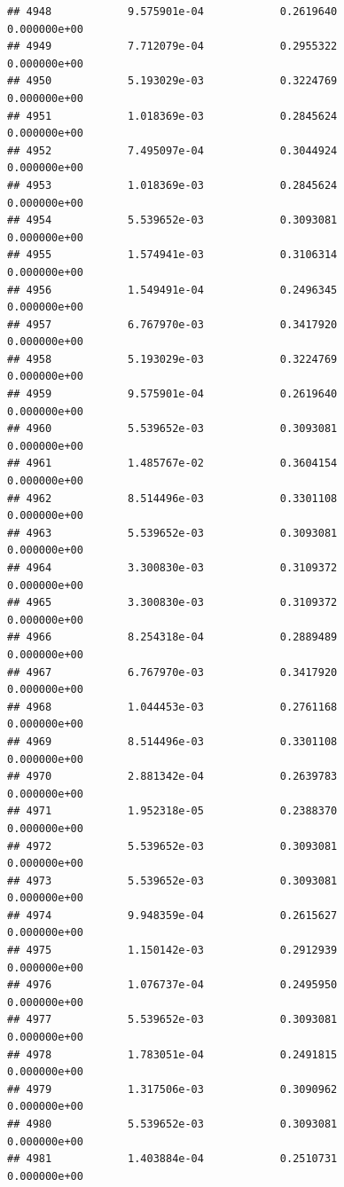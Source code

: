\documentclass[
]{article}
\begin{document}
\begin{verbatim}
## 4948            9.575901e-04            0.2619640            0.000000e+00
## 4949            7.712079e-04            0.2955322            0.000000e+00
## 4950            5.193029e-03            0.3224769            0.000000e+00
## 4951            1.018369e-03            0.2845624            0.000000e+00
## 4952            7.495097e-04            0.3044924            0.000000e+00
## 4953            1.018369e-03            0.2845624            0.000000e+00
## 4954            5.539652e-03            0.3093081            0.000000e+00
## 4955            1.574941e-03            0.3106314            0.000000e+00
## 4956            1.549491e-04            0.2496345            0.000000e+00
## 4957            6.767970e-03            0.3417920            0.000000e+00
## 4958            5.193029e-03            0.3224769            0.000000e+00
## 4959            9.575901e-04            0.2619640            0.000000e+00
## 4960            5.539652e-03            0.3093081            0.000000e+00
## 4961            1.485767e-02            0.3604154            0.000000e+00
## 4962            8.514496e-03            0.3301108            0.000000e+00
## 4963            5.539652e-03            0.3093081            0.000000e+00
## 4964            3.300830e-03            0.3109372            0.000000e+00
## 4965            3.300830e-03            0.3109372            0.000000e+00
## 4966            8.254318e-04            0.2889489            0.000000e+00
## 4967            6.767970e-03            0.3417920            0.000000e+00
## 4968            1.044453e-03            0.2761168            0.000000e+00
## 4969            8.514496e-03            0.3301108            0.000000e+00
## 4970            2.881342e-04            0.2639783            0.000000e+00
## 4971            1.952318e-05            0.2388370            0.000000e+00
## 4972            5.539652e-03            0.3093081            0.000000e+00
## 4973            5.539652e-03            0.3093081            0.000000e+00
## 4974            9.948359e-04            0.2615627            0.000000e+00
## 4975            1.150142e-03            0.2912939            0.000000e+00
## 4976            1.076737e-04            0.2495950            0.000000e+00
## 4977            5.539652e-03            0.3093081            0.000000e+00
## 4978            1.783051e-04            0.2491815            0.000000e+00
## 4979            1.317506e-03            0.3090962            0.000000e+00
## 4980            5.539652e-03            0.3093081            0.000000e+00
## 4981            1.403884e-04            0.2510731            0.000000e+00

\end{verbatim}
\end{document}
